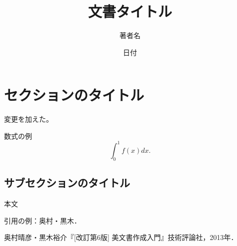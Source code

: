 \documentclass[11pt,a4j,fleqn]{jarticle}
\title{文書タイトル}
\author{著者名}
\date{日付}
\begin{document}
\maketitle

\section{セクションのタイトル}
変更を加えた。

数式の例
\[
\int_0^1 f(x) dx.
\]

\subsection{サブセクションのタイトル}

本文

引用の例：奥村・黒木\cite{OkumuraKuroki13}．


\begin{thebibliography}{0}
奥村晴彦・黒木裕介『[改訂第6版] {\LaTeXe}美文書作成入門』技術評論社，2013年．
\end{thebibliography}
\end{document}
